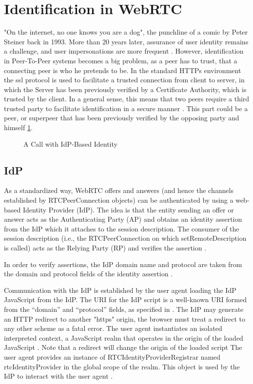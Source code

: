 \documentclass[conference]{IEEEtran}
\begin{document}
\section{Identification in WebRTC}
"On the internet, no one knows you are a dog", the punchline of a comic by Peter Steiner back in 1993.
More than 20 years later, assurance of user identity remains a challenge, and user impersonations are
more frequent \cite{User_Identity_for_WebRTC_Services_A_Matter_of_Trust}. However, identification in 
Peer-To-Peer systems becomes a big problem, as a peer has to trust, that a connecting peer is who he 
pretends to be. In the standard HTTPs environment the ssl
protocol is used to facilitate a trusted connection from client to server, in which the Server
has been previously verified by a Certificate Authority, which is trusted by the client. 
In a general sense, this means that two peers require a third trusted party to facilitate
identification in a secure manner \cite{RFC8827}. This part could be a peer, or superpeer that has been previously verified
by the opposing party and himself \cite{Security_Mechanisms_for_Signaling} \ref{fig:call_with_idp}.

\begin{figure}[h]
    
    \caption[A Call with IdP-Based Identity]{A Call with IdP-Based Identity \cite{RFC8827}}
    \label{fig:call_with_idp}
\end{figure}

\subsection{IdP}
As a standardized way, WebRTC offers and answers (and hence the channels established by
RTCPeerConnection objects) can be authenticated by using a web-based Identity
Provider (IdP). The idea is that the entity sending an offer or answer acts as the
Authenticating Party (AP) and obtains an identity assertion from the IdP which it
attaches to the session description. The consumer of the session description (i.e.,
the RTCPeerConnection on which setRemoteDescription is called) acts as the
Relying Party (RP) and verifies the assertion \cite{WebRTC_Identity}. 

In order to verify assertions, the IdP domain name and protocol are taken from the
domain and protocol fields of the identity assertion \cite{RFC8827}.

Communication with the IdP is established by the user agent loading the IdP JavaScript from
the IdP. The URI for the IdP script is a well-known URI formed from the “domain”
and “protocol” fields, as specified in \cite{RFC8827}. 
The IdP may generate an HTTP redirect to another "https" origin, the browser
must treat a redirect to any other scheme as a fatal error.
The user agent instantiates an isolated interpreted context, a JavaScript realm that
operates in the origin of the loaded JavaScript \cite{RFC8827}. Note that a redirect will change the
origin of the loaded script The user agent provides an instance of 
RTCIdentityProviderRegistrar named rtcIdentityProvider in the global scope of the realm. 
This object is used by the IdP to interact with the user agent \cite{RFC8827}. 
\end{document}
